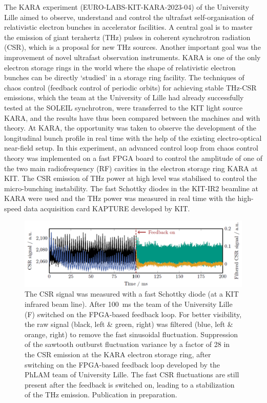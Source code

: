 The KARA experiment (EURO-LABS-KIT-KARA-2023-04) of the University Lille aimed to observe, understand and control the ultrafast self-organisation of relativistic electron bunches in accelerator facilities. A central goal is to master the emission of giant terahertz (THz) pulses in coherent synchrotron radiation (CSR), which is a proposal for new THz sources. Another important goal was the improvement of novel ultrafast observation instruments. KARA is one of the only electron storage rings in the world where the shape of relativistic electron bunches can be directly ‘studied’ in a storage ring facility. The techniques of chaos control (feedback control of periodic orbits) for achieving stable THz-CSR emissions, which the team at the University of Lille had already successfully tested at the SOLEIL synchrotron, were transferred to the KIT light source KARA, and the results have thus been compared between the machines and with theory. At KARA, the opportunity was taken to observe the development of the longitudinal bunch profile in real time with the help of the existing electro-optical near-field setup. In this experiment, an advanced control loop from chaos control theory was implemented on a fast FPGA board to control the amplitude of one of the two main radiofrequency (RF) cavities in the electron storage ring KARA at KIT. The CSR emission of THz power at high level was stabilised to control the micro-bunching instability. The fast Schottky diodes in the KIT-IR2 beamline at KARA were used and the THz power was measured in real time with the high-speed data acquisition card KAPTURE developed by KIT.
\begin{figure}[H]
    \centering
    \includegraphics[width=0.75\linewidth]{graphics/wp3-KIT_CSRsignal.png}
    \caption{The CSR signal was measured with a fast Schottky diode (at a KIT infrared beam line). After \SI{100}{ms} the team of the University Lille (F) switched on the FPGA-based feedback loop. For better visibility, the raw signal (black, left \& green, right) was filtered (blue, left \& orange, right) to remove the fast sinusoidal fluctuation. Suppression of the sawtooth outburst fluctuation variance by a factor of 28 in the CSR emission at the KARA electron storage ring, after switching on the FPGA-based feedback loop developed by the PhLAM team of University Lille. The fast CSR fluctuations are still present after the feedback is switched on, leading to a stabilization of the THz emission. Publication in preparation.}    
    \label{fig:kit_csr}
\end{figure}

